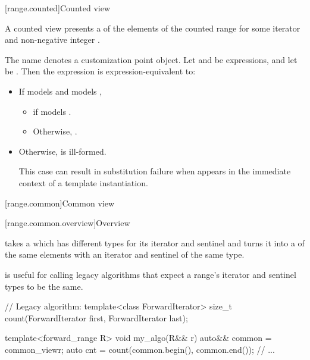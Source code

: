 \documentclass{wg21}
\begin{document}
[range.counted]{Counted view}

\pnum
A counted view presents a  of the elements
of the counted range 
for some iterator  and non-negative integer .

\pnum
The name  denotes a
customization point object.
Let  and  be expressions,
and let  be .
Then the expression  is expression-equivalent to:

\begin{itemize}
\item If  models  and
 models ,
\begin{itemize}
	\item {}
	if  models .
	\item Otherwise,
	.
\end{itemize}

\item Otherwise,  is ill-formed.
\begin{note}
	This case can result in substitution failure when 
	appears in the immediate context of a template instantiation.
\end{note}
\end{itemize}

[range.common]{Common view}

[range.common.overview]{Overview}

\pnum
{} takes a  which has different types for
its iterator and sentinel and turns it into a  of the same
elements with an iterator and sentinel of the same type.

\pnum
\begin{note}
 is useful for calling legacy algorithms that expect
a range's iterator and sentinel types to be the same.
\end{note}

\pnum
\begin{example}
\begin{codeblock}
	// Legacy algorithm:
	template<class ForwardIterator>
	size_t count(ForwardIterator first, ForwardIterator last);
	
	template<forward_range R>
	void my_algo(R&& r) {
		auto&& common = common_view{r};
		auto cnt = count(common.begin(), common.end());
		// ...
	}
\end{codeblock}
\end{example}
\end{document}
